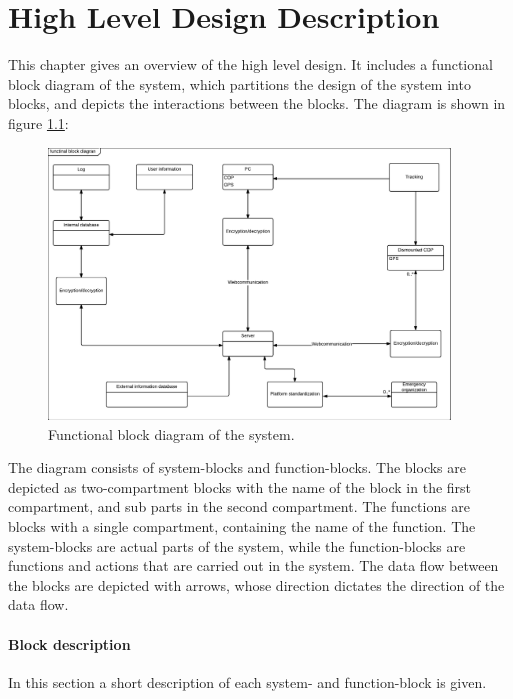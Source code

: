 \chapter{High Level Design Description}
\label{high_level}
This chapter gives an overview of the high level design. It includes a functional block diagram of the system, which partitions the design of the system into blocks, and depicts the interactions between the blocks. The diagram is shown in figure \ref{fig:func_block_diagram}:

\begin{figure}[H]
\centering
\includegraphics[width=0.95\textwidth]
{billeder/functional_block_diagram.pdf}
\caption{Functional block diagram of the system.}
\label{fig:func_block_diagram}
\end{figure}

The diagram consists of system-blocks and function-blocks. The blocks are depicted as two-compartment blocks with the name of the block in the first compartment, and sub parts in the second compartment. The functions are blocks with a single compartment, containing the name of the function. The system-blocks are actual parts of the system, while the function-blocks are functions and actions that are carried out in the system. The data flow between the blocks are depicted with arrows, whose direction dictates the direction of the data flow. 

\subsubsection{Block description}
In this section a short description of each system- and function-block is given.

